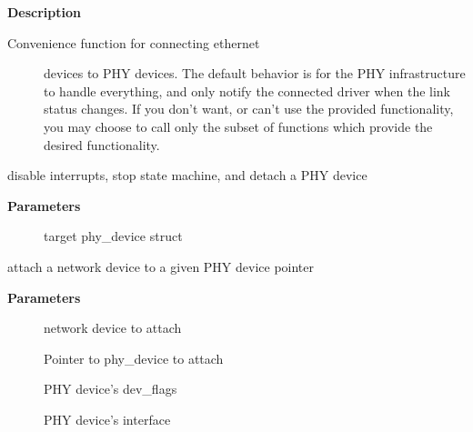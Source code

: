 \documentclass[a4paper,8pt,english]{sphinxmanual}
\begin{document}
\textbf{Description}
\begin{description}
\item[{Convenience function for connecting ethernet}] \leavevmode
devices to PHY devices.  The default behavior is for
the PHY infrastructure to handle everything, and only notify
the connected driver when the link status changes.  If you
don't want, or can't use the provided functionality, you may
choose to call only the subset of functions which provide
the desired functionality.

\end{description}

\begin{fulllineitems}
\label{networking/kapi:c.phy_disconnect}
disable interrupts, stop state machine, and detach a PHY device

\end{fulllineitems}


\textbf{Parameters}
\begin{description}
\item[{}] \leavevmode
target phy\_device struct

\end{description}

\begin{fulllineitems}
\label{networking/kapi:c.phy_attach_direct}
attach a network device to a given PHY device pointer

\end{fulllineitems}


\textbf{Parameters}
\begin{description}
\item[{}] \leavevmode
network device to attach

\item[{}] \leavevmode
Pointer to phy\_device to attach

\item[{}] \leavevmode
PHY device's dev\_flags

\item[{}] \leavevmode
PHY device's interface

\end{description}
\end{document}
